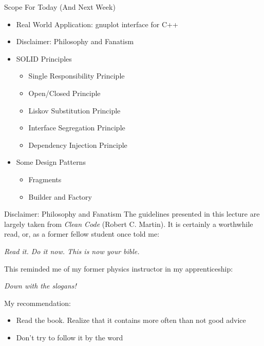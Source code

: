 
\begin{frame}{Scope For Today (And Next Week)}
%
\begin{itemize}
\item Real World Application: gnuplot interface for C++
\item Disclaimer: Philosophy and Fanatism
\item SOLID Principles
	\begin{itemize}
	\item Single Responsibility Principle
	\item Open/Closed Principle
	\color{gray}
	\item Liskov Substitution Principle
	\item Interface Segregation Principle
	\item Dependency Injection Principle
	\end{itemize}
\item Some Design Patterns
	\begin{itemize}
	\item Fragments
	\item Builder and Factory
	\end{itemize}
\end{itemize}
%
\end{frame}


\begin{frame}{Disclaimer: Philosophy and Fanatism}
%
\small
The guidelines presented in this lecture are largely taken from \emph{Clean Code} (Robert C. Martin).
It is certainly a worthwhile read, or, as a former fellow student once told me:

\begin{defbox}
\emph{Read it. Do it now. This is now your bible.}
\end{defbox}
\pause

This reminded me of my former physics instructor in my apprenticeship:
\begin{defbox}
\emph{Down with the slogans!}
\end{defbox}
\pause

My recommendation:
\begin{itemize}
\item Read the book. Realize that it contains more often than not good advice
\item Don't try to follow it by the word
\end{itemize}
%
\end{frame}

